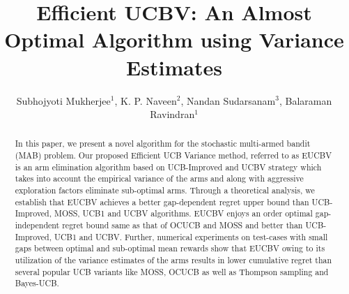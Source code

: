 \documentclass{llncs}
\begin{document}
%
\frontmatter          %
%
\pagestyle{headings}  %

\mainmatter              %
%
\title{Efficient UCBV: An Almost Optimal Algorithm using Variance Estimates}
%
%
\author{Subhojyoti Mukherjee${}^1$, K. P. Naveen${}^2$, Nandan
Sudarsanam${}^3$, Balaraman Ravindran${}^1$}
%
%
%

\maketitle              %

\begin{abstract}
In this paper, we present a novel algorithm for the stochastic multi-armed bandit (MAB) problem. Our proposed Efficient UCB Variance method, referred to as EUCBV is an arm elimination algorithm based on  UCB-Improved and UCBV strategy which takes into account the empirical variance of the arms and along  with aggressive exploration factors eliminate sub-optimal arms. Through a theoretical analysis, we establish that EUCBV achieves a better gap-dependent regret upper bound than UCB-Improved, MOSS, UCB1 and UCBV algorithms. EUCBV enjoys an order optimal gap-independent regret bound same as that of OCUCB and MOSS and better than UCB-Improved, UCB1 and UCBV. Further, numerical experiments on test-cases with small gaps between optimal and sub-optimal mean rewards show that EUCBV owing to its utilization of the variance estimates of the arms results in lower cumulative regret than several popular UCB variants like MOSS, OCUCB as well as Thompson sampling and Bayes-UCB. 

\end{abstract}
\end{document}
